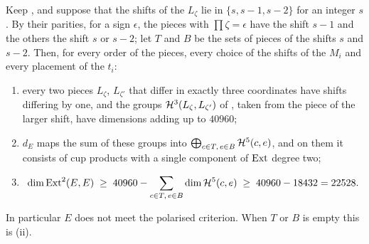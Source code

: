 \begin{theorem}
\label{thm:efourthreelevels}
Keep , and suppose that the shifts of the $L_{\zeta}$
lie in $\{s,s-1,s-2\}$ for an integer $s$. By their parities, for a sign
$\epsilon$, the pieces with $\prod\zeta=\epsilon$ have the shift $s-1$ and
the others the shift $s$ or $s-2$; let $T$ and $B$ be the sets of pieces of
the shifts $s$ and $s-2$. Then, for every order of the pieces, every choice
of the shifts of the $M_{i}$ and every placement of the $t_{i}$:
\begin{enumerate}[label=\textup{(\roman*)},leftmargin=2.6em,itemsep=2pt]
\item every two pieces $L_{\zeta}$, $L_{\zeta'}$ that differ in exactly three
  coordinates have shifts differing by one, and the groups
  $\mathcal{H}^{3}(L_{\zeta},L_{\zeta'})$ of , taken from
  the piece of the larger shift, have dimensions adding up to $40960$;
\item $d_{E}$ maps the sum of these groups into
  $\bigoplus_{c\in T,\,e\in B}\mathcal{H}^{5}(c,e)$, and on them it consists of cup
  products with a single component of $\operatorname{Ext}$ degree two;
\item
  \[
    \dim\operatorname{Ext}^{2}(E,E)\;\ge\;40960-\sum_{c\in T,\,e\in B}\dim\mathcal{H}^{5}(c,e)
    \;\ge\;40960-18432=22528 .
  \]
\end{enumerate}
In particular $E$ does not meet the polarised criterion. When $T$ or $B$ is
empty this is (ii).
\end{theorem}


